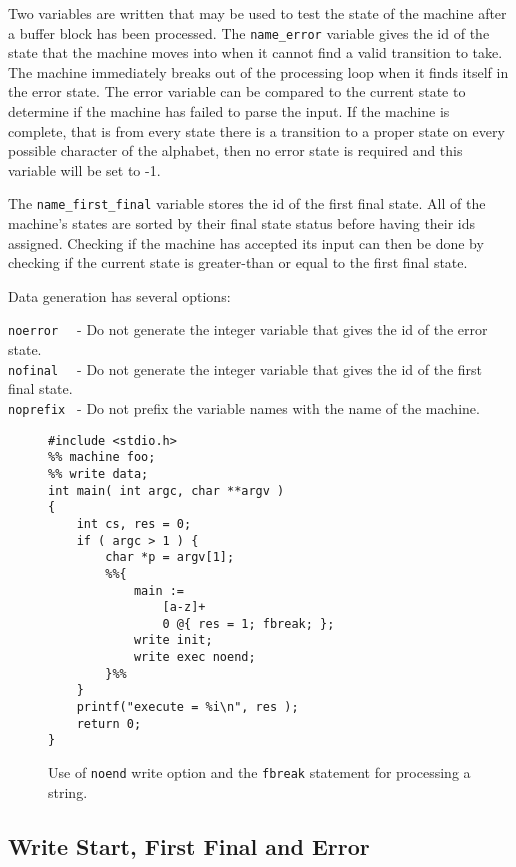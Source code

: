 \documentclass[letterpaper,11pt,oneside]{book}
\newcommand{\verbspace}{\vspace{10pt}}
\begin{document}
Two variables are written that may be used to test the state of the machine
after a buffer block has been processed. The \verb|name_error| variable gives
the id of the state that the machine moves into when it cannot find a valid
transition to take. The machine immediately breaks out of the processing loop when
it finds itself in the error state. The error variable can be compared to the
current state to determine if the machine has failed to parse the input. If the
machine is complete, that is from every state there is a transition to a proper
state on every possible character of the alphabet, then no error state is required
and this variable will be set to -1.

The \verb|name_first_final| variable stores the id of the first final state.
All of the machine's states are sorted by their final state status before
having their ids assigned. Checking if the machine has accepted its input can
then be done by checking if the current state is greater-than or equal to the
first final state.

Data generation has several options:

\noindent\hspace*{24pt}\verb|noerror  | - Do not generate the integer variable that gives the id of the error state.\\
\noindent\hspace*{24pt}\verb|nofinal  | - Do not generate the integer variable that gives the id of the first final state.\\
\noindent\hspace*{24pt}\verb|noprefix | - Do not prefix the variable names with the name of the machine.
\vspace{12pt}

\begin{figure}
\small
\begin{verbatim}
#include <stdio.h>
%% machine foo;
%% write data;
int main( int argc, char **argv )
{
    int cs, res = 0;
    if ( argc > 1 ) {
        char *p = argv[1];
        %%{ 
            main := 
                [a-z]+ 
                0 @{ res = 1; fbreak; };
            write init;
            write exec noend;
        }%%
    }
    printf("execute = %i\n", res );
    return 0;
}
\end{verbatim}
\verbspace
\caption{Use of {\tt noend} write option and the {\tt fbreak} statement for
processing a string.
}
\label{fbreak-example}
\end{figure}

\subsection{Write Start, First Final and Error}
\end{document}
